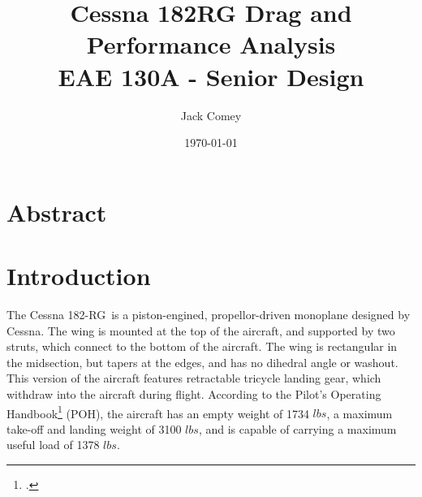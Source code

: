 \documentclass[11pt]{report}
\title{\huge \textbf{Cessna 182RG Drag and Performance Analysis} \\ \vspace{15pt}
\Large EAE 130A - Senior Design\\}
\author{Jack Comey}
\date{\today}
\newcommand{\plane}{Cessna 182-RG}
\newcommand{\lbs}{$lbs$}
\begin{document}
\maketitle

\newpage

\section*{Abstract}
 

\newpage












\nomenclature{$ $}{}




\tableofcontents
\newpage

\printnomenclature

\newpage

\section{Introduction}

The \plane\ is a piston-engined, propellor-driven monoplane designed by Cessna. The wing is mounted at the top of the aircraft, and supported by two struts, which connect to the bottom of the aircraft. The wing is rectangular in the midsection, but tapers at the edges, and has no dihedral angle or washout. This version of the aircraft features retractable tricycle landing gear, which withdraw into the aircraft during flight. According to the Pilot's Operating Handbook\footcite{POH} (POH), the aircraft has an empty weight of 1734 \lbs, a maximum take-off and landing weight of 3100 \lbs, and is capable of carrying a maximum useful load of 1378 \lbs.\\
\end{document}
